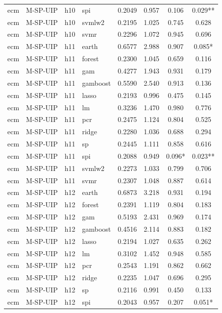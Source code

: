 \begin{ThreePartTable}
\begin{longtable}[t]{llclcccc}
ecm & M-SP-UIP & h10 & spi & 0.2049 & 0.957 & 0.106 & 0.029**\\
ecm & M-SP-UIP & h10 & svmlw2 & 0.2195 & 1.025 & 0.745 & 0.628\\
ecm & M-SP-UIP & h10 & svmr & 0.2296 & 1.072 & 0.945 & 0.696\\
\addlinespace
ecm & M-SP-UIP & h11 & earth & 0.6577 & 2.988 & 0.907 & 0.085*\\
ecm & M-SP-UIP & h11 & forest & 0.2300 & 1.045 & 0.659 & 0.116\\
ecm & M-SP-UIP & h11 & gam & 0.4277 & 1.943 & 0.931 & 0.179\\
ecm & M-SP-UIP & h11 & gamboost & 0.5590 & 2.540 & 0.913 & 0.136\\
ecm & M-SP-UIP & h11 & lasso & 0.2193 & 0.996 & 0.475 & 0.145\\
ecm & M-SP-UIP & h11 & lm & 0.3236 & 1.470 & 0.980 & 0.776\\
ecm & M-SP-UIP & h11 & pcr & 0.2475 & 1.124 & 0.804 & 0.525\\
ecm & M-SP-UIP & h11 & ridge & 0.2280 & 1.036 & 0.688 & 0.294\\
ecm & M-SP-UIP & h11 & sp & 0.2445 & 1.111 & 0.858 & 0.616\\
ecm & M-SP-UIP & h11 & spi & 0.2088 & 0.949 & 0.096* & 0.023**\\
ecm & M-SP-UIP & h11 & svmlw2 & 0.2273 & 1.033 & 0.799 & 0.706\\
ecm & M-SP-UIP & h11 & svmr & 0.2307 & 1.048 & 0.887 & 0.614\\
\addlinespace
ecm & M-SP-UIP & h12 & earth & 0.6873 & 3.218 & 0.931 & 0.194\\
ecm & M-SP-UIP & h12 & forest & 0.2391 & 1.119 & 0.804 & 0.183\\
ecm & M-SP-UIP & h12 & gam & 0.5193 & 2.431 & 0.969 & 0.174\\
ecm & M-SP-UIP & h12 & gamboost & 0.4516 & 2.114 & 0.883 & 0.182\\
ecm & M-SP-UIP & h12 & lasso & 0.2194 & 1.027 & 0.635 & 0.262\\
ecm & M-SP-UIP & h12 & lm & 0.3102 & 1.452 & 0.948 & 0.585\\
ecm & M-SP-UIP & h12 & pcr & 0.2543 & 1.191 & 0.862 & 0.662\\
ecm & M-SP-UIP & h12 & ridge & 0.2235 & 1.047 & 0.696 & 0.295\\
ecm & M-SP-UIP & h12 & sp & 0.2116 & 0.991 & 0.450 & 0.133\\
ecm & M-SP-UIP & h12 & spi & 0.2043 & 0.957 & 0.207 & 0.051*\\

\end{longtable}
\end{ThreePartTable}
